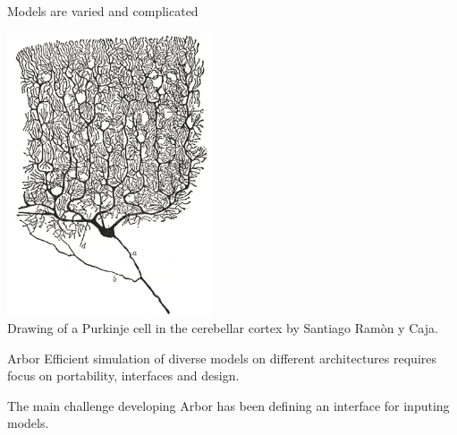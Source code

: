 \documentclass[aspectratio=43]{beamer}
\newcommand{\arbor}{{\ttfamily Arbor}\xspace}
\begin{document}
\begin{frame}[fragile]{Models are varied and complicated}

    \begin{center}
        \includegraphics[width=0.45\textwidth]{images/purkinje_cell.png}
        \\
        {
            \scriptsize Drawing of a Purkinje cell in the cerebellar cortex by Santiago Ram\`{o}n y Caja.
        }
    \end{center}
\end{frame}

\begin{frame}[fragile]{\arbor}
    Efficient simulation of diverse models on different architectures requires focus on portability, interfaces and design.

    \vspace{30pt}

    The main challenge developing \arbor has been defining an interface for inputing models.
\end{frame}
\end{document}
